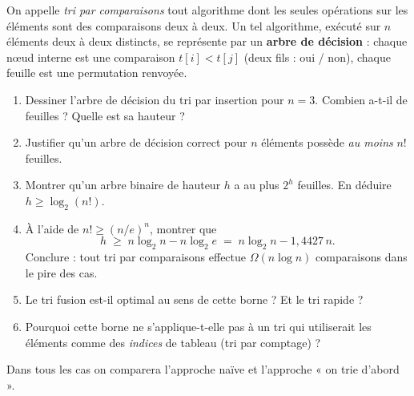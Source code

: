 \documentclass[11pt,a4paper]{article}
\begin{document}

On appelle \emph{tri par comparaisons} tout algorithme dont les seules opérations sur
les éléments sont des comparaisons deux à deux. Un tel algorithme, exécuté sur $n$
éléments deux à deux distincts, se représente par un \textbf{arbre de décision} :
chaque nœud interne est une comparaison $t[i]<t[j]$ (deux fils : oui / non), chaque
feuille est une permutation renvoyée.

\begin{enumerate}[label=\arabic*.,leftmargin=*]
  \item Dessiner l'arbre de décision du tri par insertion pour $n=3$.
        Combien a-t-il de feuilles ? Quelle est sa hauteur ?
  \item Justifier qu'un arbre de décision correct pour $n$ éléments possède
        \emph{au moins} $n!$ feuilles.
  \item Montrer qu'un arbre binaire de hauteur $h$ a au plus $2^{h}$ feuilles.
        En déduire $h \ge \log_2(n!)$.
  \item À l'aide de $n!\ge (n/e)^{n}$, montrer que
        \[
          h \;\ge\; n\log_2 n - n\log_2 e \;=\; n\log_2 n - 1{,}4427\,n .
        \]
        Conclure : tout tri par comparaisons effectue $\Omega(n\log n)$ comparaisons
        dans le pire des cas.
  \item Le tri fusion est-il optimal au sens de cette borne ? Et le tri rapide ?
  \item Pourquoi cette borne ne s'applique-t-elle pas à un tri qui utiliserait les
        éléments comme des \emph{indices} de tableau (tri par comptage) ?
\end{enumerate}

Dans tous les cas on comparera l'approche naïve et l'approche « on trie d'abord ».
\end{document}
